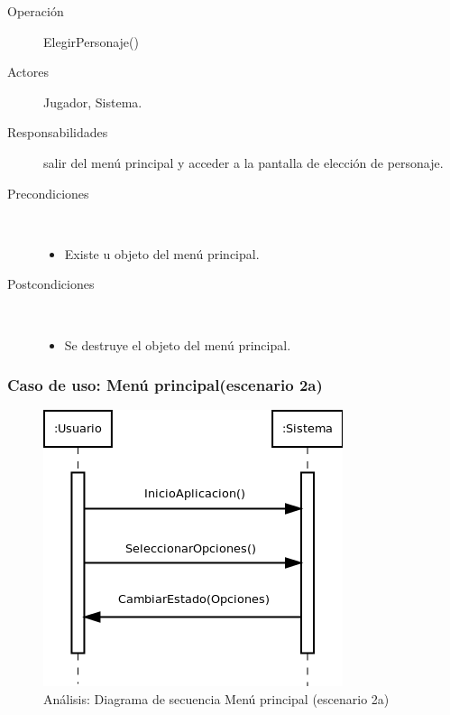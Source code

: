 \begin{description}
    \item [Operación] ElegirPersonaje()
    \item [Actores] Jugador, Sistema.
    \item [Responsabilidades] salir del menú principal y acceder a la pantalla de elección de personaje.
    \item [Precondiciones] $\quad$
        \begin{itemize}
            \item Existe u objeto del menú principal.
        \end{itemize}
    \item [Postcondiciones] $\quad$
        \begin{itemize}
            \item Se destruye el objeto del menú principal.
        \end{itemize}
\end{description}

\subsubsection{Caso de uso: Menú principal(escenario 2a)}

\begin{figure}[H]
  \label{secuencia_menu_principal2}
  \begin{center}
    \includegraphics[scale=0.7]{imagenes/analisis/secuencia_menu_principal2.png}
  \end{center}
  \caption{Análisis: Diagrama de secuencia Menú principal (escenario 2a)}
\end{figure}

